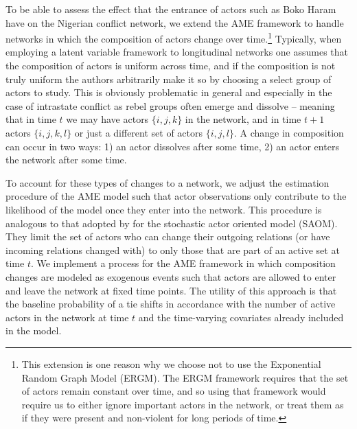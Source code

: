 To be able to assess the effect that the entrance of actors such as Boko Haram have on the Nigerian conflict network, we extend the AME framework to handle networks in which the composition of actors change over time.\footnote{This extension is one reason why we choose not to use the Exponential Random Graph Model (ERGM). The ERGM framework requires that the set of actors remain constant over time, and so using that framework would require us to either ignore important actors in the network, or treat them as if they were present and non-violent for long periods of time.} Typically, when employing a latent variable framework to longitudinal networks one assumes that the composition of actors is uniform across time, and if the composition is not truly uniform the authors arbitrarily make it so by choosing a select group of actors to study. This is obviously problematic in general and especially in the case of intrastate conflict as rebel groups often emerge and dissolve -- meaning that in time $t$ we may have actors $\{i,j,k\}$ in the network, and in time $t+1$ actors $\{i,j,k,l\}$ or just a different set of actors $\{i,j,l\}$. A change in composition can occur in two ways: 1) an actor dissolves after some time, 2) an actor enters the network after some time.

To account for these types of changes to a network, we adjust the estimation procedure of the AME model such that actor observations only contribute to the likelihood of the model once they enter into the network. This procedure is analogous to that adopted by \citet{huisman:snijders:2003} for the stochastic actor oriented model (SAOM). They limit the set of actors who can change their outgoing relations (or have incoming relations changed with) to only those that are part of an active set at time $t$. We implement a process for the AME framework in which composition changes are modeled as exogenous events such that actors are allowed to enter and leave the network at fixed time points. The utility of this approach is that the baseline probability of a tie shifts in accordance with the number of active actors in the network at time $t$ and the time-varying covariates already included in the model.

